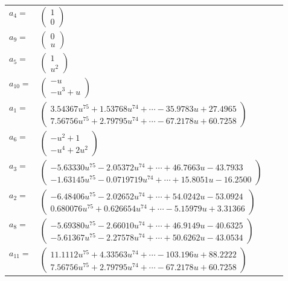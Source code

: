 \documentclass[1p]{elsarticle_modified}
\theoremstyle{definition}
\begin{document}
\begin{tabular}{m{7pt} m{180pt} m{7pt} m{180pt} }
\flushright $a_{4}=$&$\begin{pmatrix}1\\0\end{pmatrix}$ \\
\flushright $a_{9}=$&$\begin{pmatrix}0\\u\end{pmatrix}$ \\
\flushright $a_{5}=$&$\begin{pmatrix}1\\u^2\end{pmatrix}$ \\
\flushright $a_{10}=$&$\begin{pmatrix}- u\\- u^3+u\end{pmatrix}$ \\
\flushright $a_{1}=$&$\begin{pmatrix}3.54367 u^{75}+1.53768 u^{74}+\cdots-35.9783 u+27.4965\\7.56756 u^{75}+2.79795 u^{74}+\cdots-67.2178 u+60.7258\end{pmatrix}$ \\
\flushright $a_{6}=$&$\begin{pmatrix}- u^2+1\\- u^4+2 u^2\end{pmatrix}$ \\
\flushright $a_{3}=$&$\begin{pmatrix}-5.63330 u^{75}-2.05372 u^{74}+\cdots+46.7663 u-43.7933\\-1.63145 u^{75}-0.0719719 u^{74}+\cdots+15.8051 u-16.2500\end{pmatrix}$ \\
\flushright $a_{2}=$&$\begin{pmatrix}-6.48406 u^{75}-2.02652 u^{74}+\cdots+54.0242 u-53.0924\\0.680076 u^{75}+0.626654 u^{74}+\cdots-5.15979 u+3.31366\end{pmatrix}$ \\
\flushright $a_{8}=$&$\begin{pmatrix}-5.69380 u^{75}-2.66010 u^{74}+\cdots+46.9149 u-40.6325\\-5.61367 u^{75}-2.27578 u^{74}+\cdots+50.6262 u-43.0534\end{pmatrix}$ \\
\flushright $a_{11}=$&$\begin{pmatrix}11.1112 u^{75}+4.33563 u^{74}+\cdots-103.196 u+88.2222\\7.56756 u^{75}+2.79795 u^{74}+\cdots-67.2178 u+60.7258\end{pmatrix}$ \\

\end{tabular}
\end{document}
